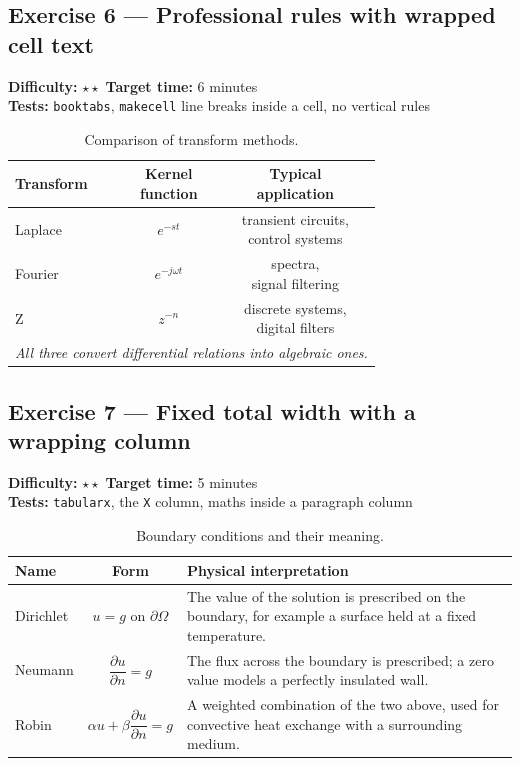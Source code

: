 \documentclass[11pt]{article}
\newcommand{\exinfo}[3]{%
  \par\noindent
  \colorbox{RoyalBlue!12}{\parbox{0.97\textwidth}{\small
  \textbf{Difficulty:} #1 \qquad \textbf{Target time:} #2 \\
  \textbf{Tests:} #3}}\par\medskip}
\begin{document}
\subsection*{Exercise 6 --- Professional rules with wrapped cell text}
\exinfo{$\star\star$}{6 minutes}{\texttt{booktabs}, \texttt{makecell}
line breaks inside a cell, no vertical rules}

\begin{table}[H]
\centering
\caption{Comparison of transform methods.}
\renewcommand{\arraystretch}{1.2}
\begin{tabular}{lcc}
\toprule
\textbf{Transform} & \makecell{\textbf{Kernel}\\\textbf{function}} &
  \makecell{\textbf{Typical}\\\textbf{application}} \\
\midrule
Laplace  & $e^{-st}$        & \makecell{transient circuits,\\control systems} \\
Fourier  & $e^{-j\omega t}$ & \makecell{spectra,\\signal filtering} \\
Z        & $z^{-n}$         & \makecell{discrete systems,\\digital filters} \\
\midrule
\multicolumn{3}{c}{\textit{All three convert differential relations into algebraic ones.}} \\
\bottomrule
\end{tabular}
\end{table}

\newpage
\subsection*{Exercise 7 --- Fixed total width with a wrapping column}
\exinfo{$\star\star$}{5 minutes}{\texttt{tabularx}, the \texttt{X} column,
maths inside a paragraph column}

\begin{table}[H]
\centering
\caption{Boundary conditions and their meaning.}
\renewcommand{\arraystretch}{1.3}
\begin{tabularx}{0.92\textwidth}{|l|c|X|}
\hline
\textbf{Name} & \textbf{Form} & \textbf{Physical interpretation} \\
\hline
Dirichlet & $u = g$ on $\partial\Omega$ &
  The value of the solution is prescribed on the boundary, for example a
  surface held at a fixed temperature. \\
\hline
Neumann & $\dfrac{\partial u}{\partial n} = g$ &
  The flux across the boundary is prescribed; a zero value models a
  perfectly insulated wall. \\
\hline
Robin & $\alpha u + \beta \dfrac{\partial u}{\partial n} = g$ &
  A weighted combination of the two above, used for convective heat
  exchange with a surrounding medium. \\
\hline
\end{tabularx}
\end{table}
\end{document}
